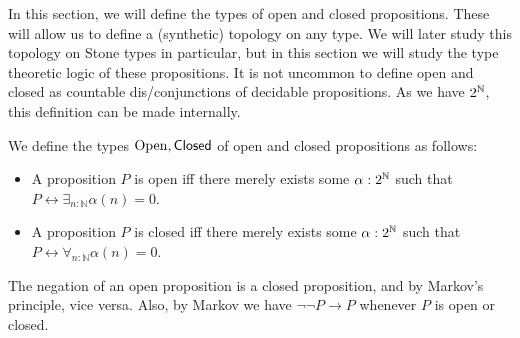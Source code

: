 In this section, we will define the types of open and closed propositions. 
These will allow us to define a (synthetic) topology  \cite{SyntheticTopologyLesnik} on any type.
We will later study this topology on Stone types in particular, 
but in this section we will study the type theoretic logic of these propositions.
It is not uncommon \cite{TODO} to define open and closed as countable dis/conjunctions of decidable propositions. 
As we have $2^{\mathbb{N}}$, this definition can be made internally. 
\begin{definition}
  We define the types $\mathrm{Open}, \mathsf{Closed}$ of open and closed propositions as follows:
  \begin{itemize}
    \item 
    A proposition $P$ is open iff there merely exists some $\alpha:2^{\mathbb{N}}$ such that 
      $P \leftrightarrow \exists_{n:\mathbb N} \alpha(n) = 0$. 
    \item 
    A proposition $P$ is closed iff there merely exists some $\alpha:2^{\mathbb{N}}$ such that 
      $P \leftrightarrow \forall_{n:\mathbb N} \alpha(n) = 0$. 
  \end{itemize}
\end{definition}

\begin{remark}\label{rmkOpenClosedNegation}
  The negation of an open proposition is a closed proposition, 
  and by Markov's principle, vice versa. 
  Also, by Markov we have $\neg \neg P \to P$ whenever $P$ is open or closed. 
\end{remark}

